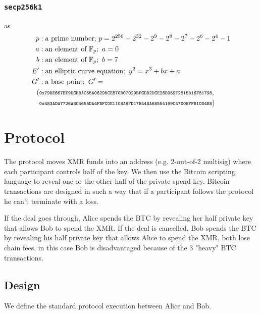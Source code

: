 \documentclass{llncs}
\begin{document}
\subsubsection{\texttt{secp256k1}} as
\begin{equation}
\begin{split}
    p&: \text{a prime number;}\ p = 2^{256} - 2^{32} - 2^9 - 2^8 - 2^7 - 2^6 - 2^4 - 1 \\
    a&: \text{an element of } \mathbb{F}_p;\ a = 0 \\
    b&: \text{an element of } \mathbb{F}_p;\ b = 7 \\
    E'&: \text{an elliptic curve equation};\ y^2 = x^3 + bx + a \\
    G'&: \text{a base point};\ G' = \\ (&\scriptsize\texttt{0x79BE667EF9DCBBAC55A06295CE870B07029BFCDB2DCE28D959F2815B16F81798},\\ &\scriptsize\texttt{0x483ADA7726A3C4655DA4FBFC0E1108A8FD17B448A68554199C47D08FFB10D4B8}) \\
\end{split}
\end{equation}

\section{Protocol}
The protocol moves XMR funds into an address (e.g. 2-out-of-2 multisig) where each participant controls half of the key. We then use the Bitcoin scripting language to reveal one or the other half of the private spend key. Bitcoin transactions are designed in such a way that if a participant follows the protocol he can't terminate with a loss.

If the deal goes through, Alice spends the BTC by revealing her half private key that allows Bob to spend the XMR. If the deal is cancelled, Bob spends the BTC by revealing his half private key that allows Alice to spend the XMR, both lose chain fees, in this case Bob is disadvantaged because of the 3 "heavy" BTC transactions.

\subsection{Design}
We define the standard protocol execution between Alice and Bob.
\end{document}
